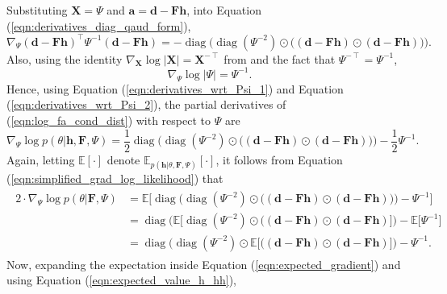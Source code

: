 \documentclass[msc,deptreport.inf]{infthesis} %
\newcommand{\matr}[1]{\mathbf{#1}}
\newcommand{\E}{\mathbb E}
\newcommand{\diag}{\mathop{\mathrm{diag}}}
\begin{document}
Substituting $\matr{X} = \Psi$ and $\matr{a} = \matr{d}- \matr{Fh}$, into Equation (\ref{eqn:derivatives_diag_qaud_form}),
\begin{equation}\label{eqn:derivatives_wrt_Psi_1}
	\nabla_\Psi (\matr{d} - \matr{Fh})^\intercal \Psi^{-1} (\matr{d}- \matr{Fh}) 
	= -\diag\Big(\diag(\Psi^{-2}) \odot \big((\matr{d} - \matr{Fh}) \odot (\matr{d} - \matr{Fh})\big)\Big).
\end{equation}
Also, using the identity $\nabla_\matr{X} \log |\matr{X}| = \matr{X}^{-\intercal}$ from \cite{petersen2012} and the fact that $\Psi^{-\intercal} = \Psi^{-1}$, 
\begin{equation}\label{eqn:derivatives_wrt_Psi_2}
	\nabla_\Psi \log |\Psi|
	= \Psi^{-1}.
\end{equation}
Hence, using Equation (\ref{eqn:derivatives_wrt_Psi_1}) and Equation (\ref{eqn:derivatives_wrt_Psi_2}), the partial derivatives of (\ref{eqn:log_fa_cond_dist}) with respect to $\Psi$ are
\begin{equation}
	\nabla_{\Psi} \log p(\theta | \matr{h}, \matr{F}, \Psi)
	= \frac{1}{2} \diag\Big(\diag(\Psi^{-2}) \odot \big((\matr{d} - \matr{Fh}) \odot (\matr{d} - \matr{Fh})\big)\Big) - \frac{1}{2}\Psi^{-1}.
\end{equation}
Again, letting $\E[\cdot]$ denote $\E_{p(\matr{h} | \theta, \matr{F}, \Psi)}[\cdot]$, it follows from Equation (\ref{eqn:simplified_grad_log_likelihood}) that
\begin{align}\label{eqn:expected_gradient}
\begin{split}
	2 \cdot \nabla_{\Psi} \log p(\theta | \matr{F}, \Psi) 
	& = \E \Big[ \diag\Big(\diag(\Psi^{-2}) \odot \big((\matr{d} - \matr{Fh}) \odot (\matr{d} - \matr{Fh})\big)\Big) - \Psi^{-1} \Big] \\
	& = \diag\Big(\E \big[\diag(\Psi^{-2}) \odot \big((\matr{d} - \matr{Fh}) \odot (\matr{d} - \matr{Fh})\big]\Big) - \E \big[ \Psi^{-1} \big] \\
	& = \diag\Big(\diag(\Psi^{-2}) \odot \E \big[\big((\matr{d} - \matr{Fh}) \odot (\matr{d} - \matr{Fh})\big]\Big) - \Psi^{-1}.
\end{split}
\end{align} 
Now, expanding the expectation inside Equation (\ref{eqn:expected_gradient}) and using Equation (\ref{eqn:expected_value_h_hh}),
\end{document}
